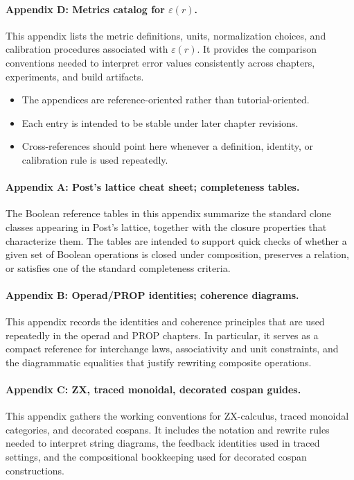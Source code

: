 \documentclass[11pt]{article}
\begin{document}
\paragraph{Appendix D: Metrics catalog for $\varepsilon(r)$.} This appendix lists the metric definitions, units, normalization choices, and calibration procedures associated with $\varepsilon(r)$. It provides the comparison conventions needed to interpret error values consistently across chapters, experiments, and build artifacts.

\begin{itemize}
  \item The appendices are reference-oriented rather than tutorial-oriented.
  \item Each entry is intended to be stable under later chapter revisions.
  \item Cross-references should point here whenever a definition, identity, or calibration rule is used repeatedly.
\end{itemize}

\paragraph{Appendix A: Post's lattice cheat sheet; completeness tables.} The Boolean reference tables in this appendix summarize the standard clone classes appearing in Post's lattice, together with the closure properties that characterize them. The tables are intended to support quick checks of whether a given set of Boolean operations is closed under composition, preserves a relation, or satisfies one of the standard completeness criteria.

\paragraph{Appendix B: Operad/PROP identities; coherence diagrams.} This appendix records the identities and coherence principles that are used repeatedly in the operad and PROP chapters. In particular, it serves as a compact reference for interchange laws, associativity and unit constraints, and the diagrammatic equalities that justify rewriting composite operations.

\paragraph{Appendix C: ZX, traced monoidal, decorated cospan guides.} This appendix gathers the working conventions for ZX-calculus, traced monoidal categories, and decorated cospans. It includes the notation and rewrite rules needed to interpret string diagrams, the feedback identities used in traced settings, and the compositional bookkeeping used for decorated cospan constructions.
\end{document}
